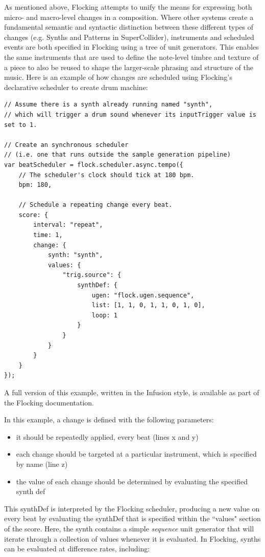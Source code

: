 \documentclass{article}
\begin{document}
As mentioned above, Flocking attempts to unify the means for expressing both micro- and macro-level changes in a composition. Where other systems create a fundamental semantic and syntactic distinction between these different types of changes (e.g. Synths and Patterns in SuperCollider), instruments and scheduled events are both specified in Flocking using a tree of unit generators. This enables the same instruments that are used to define the note-level timbre and texture of a piece to also be reused to shape the larger-scale phrasing and structure of the music. Here is an example of how changes are scheduled using Flocking's declarative scheduler to create drum machine:

\begin{verbatim}
// Assume there is a synth already running named "synth",
// which will trigger a drum sound whenever its inputTrigger value is set to 1.

// Create an synchronous scheduler
// (i.e. one that runs outside the sample generation pipeline)
var beatScheduler = flock.scheduler.async.tempo({
    // The scheduler's clock should tick at 180 bpm.
    bpm: 180,

    // Schedule a repeating change every beat.
    score: {
        interval: "repeat",
        time: 1,
        change: {
            synth: "synth",
            values: {
                "trig.source": {
                    synthDef: {
                        ugen: "flock.ugen.sequence",
                        list: [1, 1, 0, 1, 1, 0, 1, 0],
                        loop: 1
                    }
                }
            }
        }
    }
});

\end{verbatim}

A full version of this example, written in the Infusion style, is available as part of the Flocking documentation.

In this example, a change is defined with the following parameters:

\begin{itemize}
\item it should be repeatedly applied, every beat (lines x and y)
\item each change should be targeted at a particular instrument, which is specified by name (line z)
\item the value of each change should be determined by evaluating the specified synth def
\end{itemize}

This synthDef is interpreted by the Flocking scheduler, producing a new value on every beat by evaluating the synthDef that is specified within the ``values" section of the score. Here, the synth contains a simple {\it sequence} unit generator that will iterate through a collection of values whenever it is evaluated. In Flocking, synths can be evaluated at difference rates, including:
\end{document}
